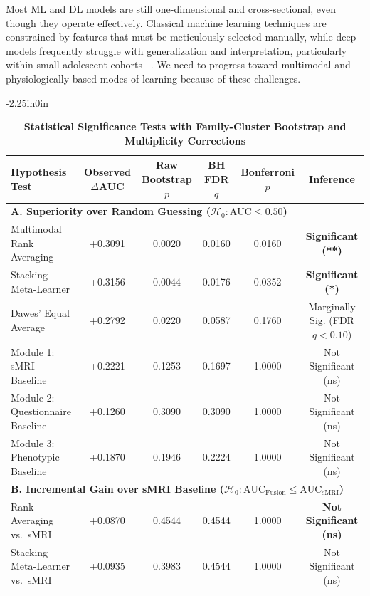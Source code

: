 \documentclass[10pt,letterpaper]{article}
\begin{document}
        Most ML and DL models are still one-dimensional and cross-sectional, even though they operate effectively. Classical machine learning techniques are constrained by features that must be meticulously selected manually, while deep models frequently struggle with generalization and interpretation, particularly within small adolescent cohorts ~\cite{ref15,ref16}. We need to progress toward multimodal and physiologically based modes of learning because of these challenges.

        \begin{table}[!t]
\begin{adjustwidth}{-2.25in}{0in}
\centering
\caption{\textbf{Statistical Significance Tests with Family-Cluster Bootstrap and Multiplicity Corrections}}
\label{tab:stat_tests}
\footnotesize
\renewcommand{\arraystretch}{1.25}
\begin{tabular}{|l|c|c|c|c|c|}
\hline
\textbf{Hypothesis Test} & \textbf{Observed $\Delta$AUC} & \textbf{Raw Bootstrap $p$} & \textbf{BH FDR $q$} & \textbf{Bonferroni $p$} & \textbf{Inference} \\
\hline
\multicolumn{6}{|l|}{\textbf{A. Superiority over Random Guessing ($\mathcal{H}_0: \text{AUC} \le 0.50$)}} \\
\hline
Multimodal Rank Averaging & +0.3091 & 0.0020 & 0.0160 & 0.0160 & \textbf{Significant (**)} \\
\hline
Stacking Meta-Learner & +0.3156 & 0.0044 & 0.0176 & 0.0352 & \textbf{Significant (*)} \\
\hline
Dawes' Equal Average & +0.2792 & 0.0220 & 0.0587 & 0.1760 & Marginally Sig. (FDR $q<0.10$) \\
\hline
Module 1: sMRI Baseline & +0.2221 & 0.1253 & 0.1697 & 1.0000 & Not Significant (ns) \\
\hline
Module 2: Questionnaire Baseline & +0.1260 & 0.3090 & 0.3090 & 1.0000 & Not Significant (ns) \\
\hline
Module 3: Phenotypic Baseline & +0.1870 & 0.1946 & 0.2224 & 1.0000 & Not Significant (ns) \\
\hline
\multicolumn{6}{|l|}{\textbf{B. Incremental Gain over sMRI Baseline ($\mathcal{H}_0: \text{AUC}_{\text{Fusion}} \le \text{AUC}_{\text{sMRI}}$)}} \\
\hline
Rank Averaging vs.\ sMRI & +0.0870 & 0.4544 & 0.4544 & 1.0000 & \textbf{Not Significant (ns)} \\
\hline
Stacking Meta-Learner vs.\ sMRI & +0.0935 & 0.3983 & 0.4544 & 1.0000 & Not Significant (ns) \\

\end{tabular}
\end{adjustwidth}
\end{table}
\end{document}
